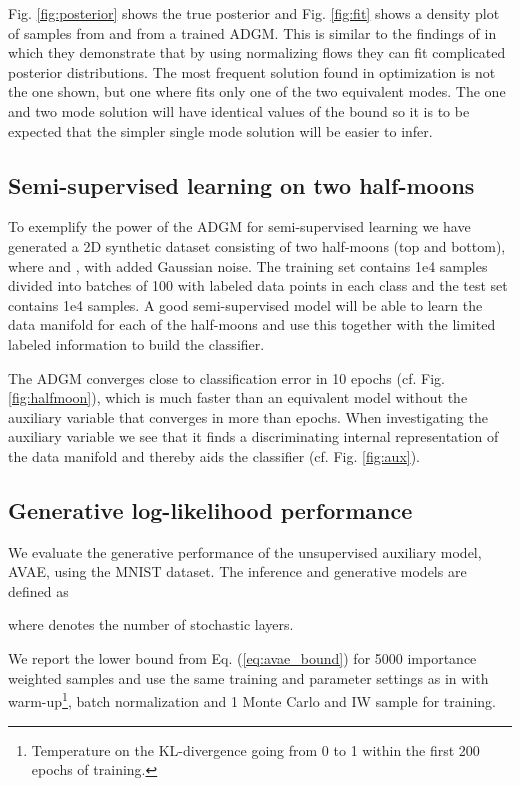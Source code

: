 \documentclass{article}
\begin{document}
Fig. \ref{fig:posterior} shows the true posterior and Fig. \ref{fig:fit} shows a density plot of  samples from  and  from a trained ADGM. This is similar to the findings of \citet{Rezende2015} in which they demonstrate that by using normalizing flows they can fit complicated posterior distributions. The most frequent solution found in optimization is not the one shown, but one where  fits only one of the two equivalent modes. The one and two mode solution will have identical values of the bound so it is to be expected that the simpler single mode solution will be easier to infer.

\subsection{Semi-supervised learning on two half-moons}\label{sec:halfmoons}
To exemplify the power of the ADGM for semi-supervised learning we have generated a 2D synthetic dataset consisting of two half-moons (top and bottom), where   and  , with added Gaussian noise. The training set contains 1e4 samples divided into batches of 100 with  labeled data points in each class and the test set contains 1e4 samples. A good semi-supervised model will be able to learn the data manifold for each of the half-moons and use this together with the limited labeled information to build the classifier. 

The ADGM converges close to  classification error in 10 epochs (cf. Fig. \ref{fig:halfmoon}), which is much faster than an equivalent model without the auxiliary variable that converges in more than  epochs. When investigating the auxiliary variable we see that it finds a discriminating internal representation of the data manifold and thereby aids the classifier (cf. Fig. \ref{fig:aux}).

\subsection{Generative log-likelihood performance}\label{sec:loglikelihood}
We evaluate the generative performance of the unsupervised auxiliary model, AVAE, using the MNIST dataset. The inference and generative models are defined as

where  denotes the number of stochastic layers. 

We report the lower bound from Eq. (\ref{eq:avae_bound}) for 5000 importance weighted samples and use the same training and parameter settings as in \citet{Sonderby2016} with warm-up\footnote{Temperature on the KL-divergence going from 0 to 1 within the first 200 epochs of training.}, batch normalization and 1 Monte Carlo and IW sample for training.
\end{document}

